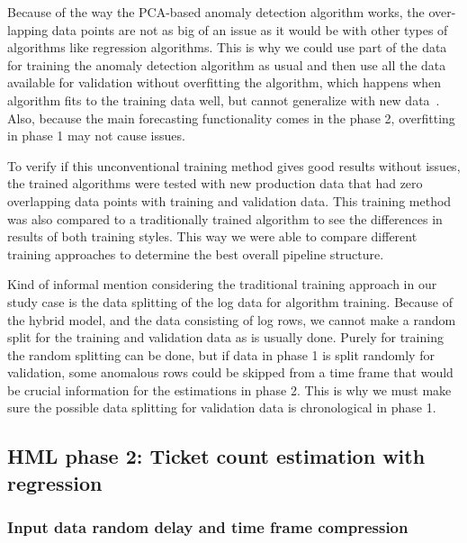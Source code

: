 Because of the way the PCA-based anomaly detection algorithm works,
the over-lapping data points are not as big of an issue
as it would be with other types of algorithms
like regression algorithms.
This is why we could use part of the data
for training the anomaly detection algorithm as usual
and then use all the data available for validation
without overfitting the algorithm,
which happens when algorithm fits to the training data well,
but cannot generalize with new data~\cite{wang2016machine}.
Also, because the main forecasting functionality comes in the phase 2,
overfitting in phase 1 may not cause issues.

To verify if this unconventional training method gives good results without issues,
the trained algorithms were tested with new production data
that had zero overlapping data points with training and validation data.
This training method was also compared to a traditionally trained algorithm
to see the differences in results of both training styles.
This way we were able to compare different training approaches
to determine the best overall pipeline structure.

Kind of informal mention considering
the traditional training approach in our study case
is the data splitting of the log data for algorithm training.
Because of the hybrid model,
and the data consisting of log rows,
we cannot make a random split for the training and validation data
as is usually done.
Purely for training
the random splitting can be done,
but if data in phase 1 is split randomly for validation,
some anomalous rows could be skipped from a time frame
that would be crucial information for the estimations in phase 2.
This is why we must make sure the possible data splitting for validation data
is chronological in phase 1.




\subsection{HML phase 2: Ticket count estimation with regression}\label{subsec:pipe-regression-estimating}



\subsubsection*{Input data random delay and time frame compression}\label{subsec:pipe-random-delay-and-timeframe-compression}

